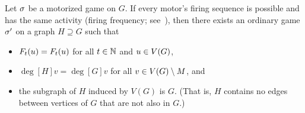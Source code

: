 \begin{thm} \label{natMotors}
Let $\sigma$ be a motorized game on $G$. If every motor's firing sequence is
possible and has the same activity (firing frequency; see~\cite{levine}), then
there exists an ordinary game $\sigma'$ on a graph $H \supseteq G$ such that
\begin{itemize}
\item $\firing[\s']{u}{t} = \firing{u}{t}$ for all $t \in \mathbb{N}$ and $u \in
  V(G)$,
\item $\deg[H]{v} = \deg[G]{v}$ for all $v \in \V \setminus \mots$, and
\item the subgraph of $H$ induced by $V(G)$ is $G$. (That is, $H$ contains no
  edges between vertices of $G$ that are not also in $G$.)
\end{itemize}
\end{thm}

